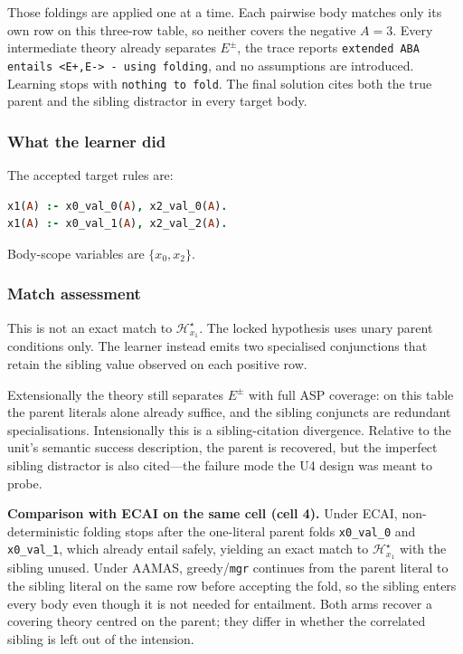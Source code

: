 \documentclass[11pt]{article}
\begin{document}
Those foldings are applied one at a time. Each pairwise body matches only its own row on this three-row table, so neither covers the negative \(A=3\). Every intermediate theory already separates \(E^\pm\), the trace reports \texttt{extended ABA entails <E+,E-> - using folding}, and no assumptions are introduced. Learning stops with \texttt{nothing to fold}. The final solution cites both the true parent and the sibling distractor in every target body.

\subsubsection{What the learner did}

The accepted target rules are:

\begin{lstlisting}[style=logic,language=Prolog]
x1(A) :- x0_val_0(A), x2_val_0(A).
x1(A) :- x0_val_1(A), x2_val_2(A).
\end{lstlisting}

Body-scope variables are \(\{x_0,x_2\}\).

\subsubsection{Match assessment}

This is not an exact match to \(\mathcal{H}_{x_1}^\star\). The locked hypothesis uses unary parent conditions only. The learner instead emits two specialised conjunctions that retain the sibling value observed on each positive row.

Extensionally the theory still separates \(E^\pm\) with full ASP coverage: on this table the parent literals alone already suffice, and the sibling conjuncts are redundant specialisations. Intensionally this is a sibling-citation divergence. Relative to the unit's semantic success description, the parent is recovered, but the imperfect sibling distractor is also cited---the failure mode the U4 design was meant to probe.

\textbf{Comparison with ECAI on the same cell (cell 4).} Under ECAI, non-deterministic folding stops after the one-literal parent folds \texttt{x0\_val\_0} and \texttt{x0\_val\_1}, which already entail safely, yielding an exact match to \(\mathcal{H}_{x_1}^\star\) with the sibling unused. Under AAMAS, greedy/\texttt{mgr} continues from the parent literal to the sibling literal on the same row before accepting the fold, so the sibling enters every body even though it is not needed for entailment. Both arms recover a covering theory centred on the parent; they differ in whether the correlated sibling is left out of the intension.
\end{document}
